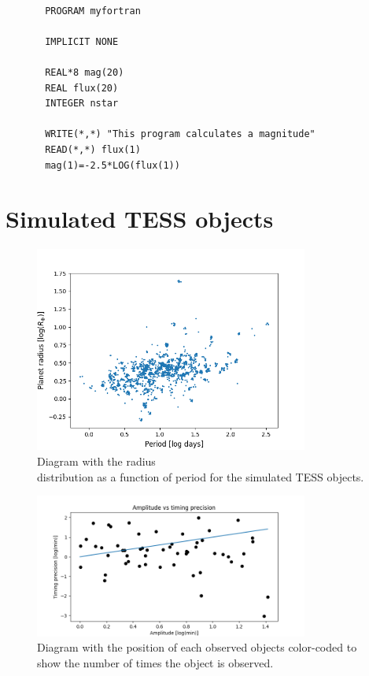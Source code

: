 \documentclass[12pt]{report}
\begin{document}
\begin{verbatim}

       PROGRAM myfortran

       IMPLICIT NONE

       REAL*8 mag(20)
       REAL flux(20)
       INTEGER nstar

       WRITE(*,*) "This program calculates a magnitude"
       READ(*,*) flux(1)
       mag(1)=-2.5*LOG(flux(1))

\end{verbatim}
\fi

\section{Simulated TESS objects}



\begin{figure}
 	 \centering
 	 \includegraphics[width=9cm]{img/R_P-plot_5.png}
 	 \caption{Diagram with the radius \\distribution as a function of period for the simulated TESS objects.}
 	 \label{fig:RP_plot}
\end{figure}

\begin{figure}
 	 \centering
	  \includegraphics[width=9cm]{img/ampErrorLog.png}
	  \caption{Diagram with the position of each observed objects color-coded to show the number of times the object is observed.}
	 \label{fig:pos_num_obs}
\end{figure}
\end{document}
